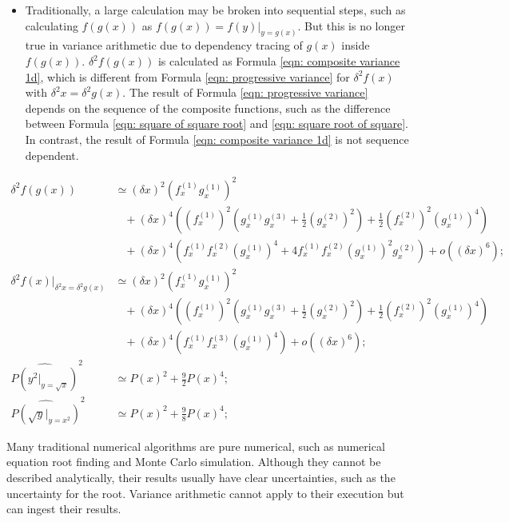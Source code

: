 \documentclass[twoside]{article}
\numberwithin{equation}{section}
\newcommand{\eqspace}{\;\;\;}
\begin{document}
\begin{itemize}
\item
Traditionally, a large calculation may be broken into sequential steps, such as calculating $f(g(x))$ as $f(g(x)) = f(y)|_{y = g(x)}$.
But this is no longer true in variance arithmetic due to dependency tracing of $g(x)$ inside $f(g(x))$. 
$\delta^2 f(g(x))$ is calculated as Formula \eqref{eqn: composite variance 1d}, which is different from Formula \eqref{eqn: progressive variance} for $\delta^2 f(x)$ with $\delta^2 x = \delta^2 g(x)$.
The result of Formula \eqref{eqn: progressive variance} depends on the sequence of the composite functions, such as  the difference between Formula \eqref{eqn: square of square root} and \eqref{eqn: square root of square}.
In contrast, the result of Formula \eqref{eqn: composite variance 1d} is not sequence dependent.

\end{itemize}

\begin{align}
\label{eqn: composite variance 1d}
\delta^2 f(g(x)) &\simeq (\delta x)^2 (f^{(1)}_x g^{(1)}_x)^2 \\
  &\eqspace + (\delta x)^4 \left( (f^{(1)}_x)^2 (g^{(1)}_x g^{(3)}_x + \frac{1}{2}(g^{(2)}_x)^2) + \frac{1}{2} (f^{(2)}_x)^2 (g^{(1)}_x)^4 \right) \nonumber \\
  &\eqspace + (\delta x)^4 \left( f^{(1)}_x f^{(2)}_x (g^{(1)}_x)^4 + 4 f^{(1)}_x f^{(2)}_x (g^{(1)}_x)^2 g^{(2)}_x \right) + o((\delta x)^6);  \nonumber\\
\label{eqn: progressive variance}
\delta^2 f(x)|_{\delta^2 x = \delta^2 g(x)} &\simeq (\delta x)^2 (f^{(1)}_x g^{(1)}_x)^2 \\
  &\eqspace + (\delta x)^4 \left( (f^{(1)}_x)^2 (g^{(1)}_x g^{(3)}_x + \frac{1}{2}(g^{(2)}_x)^2) + \frac{1}{2} (f^{(2)}_x)^2 (g^{(1)}_x)^4 \right) \nonumber \\
  &\eqspace + (\delta x)^4 \left( f^{(1)}_x f^{(3)}_x (g^{(1)}_x)^4 \right) + o((\delta x)^6);  \nonumber \\
\label{eqn: square of square root}
\widehat{P(y^2|_{y=\sqrt{x}})}^2 & \simeq P(x)^2 + \frac{9}{2} P(x)^4; \\
\label{eqn: square root of square}
\widehat{P(\sqrt{y}|_{y=x^2})}^2 & \simeq P(x)^2 + \frac{9}{8} P(x)^4;
\end{align}

Many traditional numerical algorithms are pure numerical, such as numerical equation root finding and Monte Carlo simulation.
Although they cannot be described analytically, their results usually have clear uncertainties, such as the uncertainty for the root.
Variance arithmetic cannot apply to their execution but can ingest their results.
\end{document}
